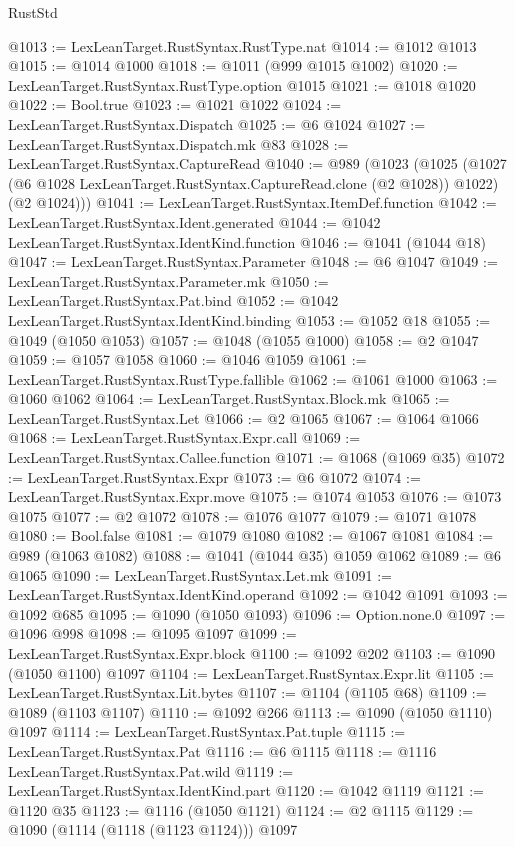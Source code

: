 \begin{lexlean}{RustStd}
\begin{coremodule}
{\begin{coremodule}
{{{{{{{{{{{{{{@1013 := LexLeanTarget.RustSyntax.RustType.nat
@1014 := @1012 @1013
@1015 := @1014 @1000
@1018 := @1011 (@999 @1015 @1002)
@1020 := LexLeanTarget.RustSyntax.RustType.option @1015
@1021 := @1018 @1020
@1022 := Bool.true
@1023 := @1021 @1022
@1024 := LexLeanTarget.RustSyntax.Dispatch
@1025 := @6 @1024
@1027 := LexLeanTarget.RustSyntax.Dispatch.mk @83
@1028 := LexLeanTarget.RustSyntax.CaptureRead
@1040 := @989
    (@1023
      (@1025
        (@1027 (@6 @1028 LexLeanTarget.RustSyntax.CaptureRead.clone (@2 @1028)) @1022)
        (@2 @1024)))
@1041 := LexLeanTarget.RustSyntax.ItemDef.function
@1042 := LexLeanTarget.RustSyntax.Ident.generated
@1044 := @1042 LexLeanTarget.RustSyntax.IdentKind.function
@1046 := @1041 (@1044 @18)
@1047 := LexLeanTarget.RustSyntax.Parameter
@1048 := @6 @1047
@1049 := LexLeanTarget.RustSyntax.Parameter.mk
@1050 := LexLeanTarget.RustSyntax.Pat.bind
@1052 := @1042 LexLeanTarget.RustSyntax.IdentKind.binding
@1053 := @1052 @18
@1055 := @1049 (@1050 @1053)
@1057 := @1048 (@1055 @1000)
@1058 := @2 @1047
@1059 := @1057 @1058
@1060 := @1046 @1059
@1061 := LexLeanTarget.RustSyntax.RustType.fallible
@1062 := @1061 @1000
@1063 := @1060 @1062
@1064 := LexLeanTarget.RustSyntax.Block.mk
@1065 := LexLeanTarget.RustSyntax.Let
@1066 := @2 @1065
@1067 := @1064 @1066
@1068 := LexLeanTarget.RustSyntax.Expr.call
@1069 := LexLeanTarget.RustSyntax.Callee.function
@1071 := @1068 (@1069 @35)
@1072 := LexLeanTarget.RustSyntax.Expr
@1073 := @6 @1072
@1074 := LexLeanTarget.RustSyntax.Expr.move
@1075 := @1074 @1053
@1076 := @1073 @1075
@1077 := @2 @1072
@1078 := @1076 @1077
@1079 := @1071 @1078
@1080 := Bool.false
@1081 := @1079 @1080
@1082 := @1067 @1081
@1084 := @989 (@1063 @1082)
@1088 := @1041 (@1044 @35) @1059 @1062
@1089 := @6 @1065
@1090 := LexLeanTarget.RustSyntax.Let.mk
@1091 := LexLeanTarget.RustSyntax.IdentKind.operand
@1092 := @1042 @1091
@1093 := @1092 @685
@1095 := @1090 (@1050 @1093)
@1096 := Option.none.{0}
@1097 := @1096 @998
@1098 := @1095 @1097
@1099 := LexLeanTarget.RustSyntax.Expr.block
@1100 := @1092 @202
@1103 := @1090 (@1050 @1100) @1097
@1104 := LexLeanTarget.RustSyntax.Expr.lit
@1105 := LexLeanTarget.RustSyntax.Lit.bytes
@1107 := @1104 (@1105 @68)
@1109 := @1089 (@1103 @1107)
@1110 := @1092 @266
@1113 := @1090 (@1050 @1110) @1097
@1114 := LexLeanTarget.RustSyntax.Pat.tuple
@1115 := LexLeanTarget.RustSyntax.Pat
@1116 := @6 @1115
@1118 := @1116 LexLeanTarget.RustSyntax.Pat.wild
@1119 := LexLeanTarget.RustSyntax.IdentKind.part
@1120 := @1042 @1119
@1121 := @1120 @35
@1123 := @1116 (@1050 @1121)
@1124 := @2 @1115
@1129 := @1090 (@1114 (@1118 (@1123 @1124))) @1097
}}}}}}}}}}}}}}
\end{coremodule}}
\end{coremodule}
\end{lexlean}
